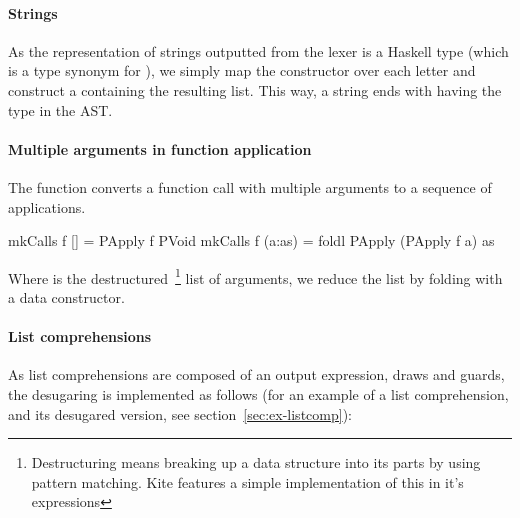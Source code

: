 \paragraph{Strings}
As the representation of strings outputted from the lexer is a Haskell  type (which is a type synonym for \code{[Char]}), we simply map the  constructor over each letter and construct a  containing the resulting list. This way, a string ends with having the type  in the AST.

\paragraph{Multiple arguments in function application}
The  function converts a function call with multiple arguments to a sequence of applications.

\begin{haskell}

mkCalls f [] = PApply f PVoid
mkCalls f (a:as) = foldl PApply (PApply f a) as
\end{haskell}

Where  is the destructured~\footnote{Destructuring means breaking up a data structure into its parts by using pattern matching. Kite features a simple implementation of this in it's  expressions} list of arguments, we reduce the list by folding with a  data constructor.

\paragraph{List comprehensions}
As list comprehensions are composed of an output expression, draws and guards, the desugaring is implemented as follows (for an example of a list comprehension, and its desugared version, see section~\ref{sec:ex-listcomp}):

